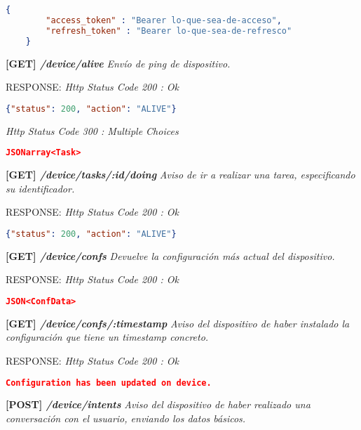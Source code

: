     \begin{lstlisting}[language=json,firstnumber=1]
    {
        "access_token" : "Bearer lo-que-sea-de-acceso",
        "refresh_token" : "Bearer lo-que-sea-de-refresco"
    }
    \end{lstlisting}    
\newpage
\textbf{[GET] \textit{/device/alive }}
\textit{Envío de ping de dispositivo.}
    
    RESPONSE:\newline
    \textit{Http Status Code 200 : Ok}
    
    \begin{lstlisting}[language=json,firstnumber=1]
    {"status": 200, "action": "ALIVE"}
    \end{lstlisting}
    \textit{Http Status Code 300 : Multiple Choices}
    
    \begin{lstlisting}[language=json,firstnumber=1]
    JSONarray<Task>
    \end{lstlisting}
\hline 
\newline
\textbf{[GET] \textit{/device/tasks/:id/doing }}
\textit{Aviso de ir a realizar una tarea, especificando su identificador.}
    
    RESPONSE: \newline
    \textit{Http Status Code 200 : Ok}
    
    \begin{lstlisting}[language=json,firstnumber=1]
    {"status": 200, "action": "ALIVE"}
    \end{lstlisting}
\hline 
\newline
\textbf{[GET] \textit{/device/confs }}
\textit{Devuelve la configuración más actual del dispositivo.}
    
    RESPONSE: \newline
    \textit{Http Status Code 200 : Ok}
    
    \begin{lstlisting}[language=json,firstnumber=1]
    JSON<ConfData>
    \end{lstlisting}
\hline 
\newline
\textbf{[GET] \textit{/device/confs/:timestamp }}
\textit{Aviso del dispositivo de haber instalado la configuración que tiene un timestamp concreto.}

    RESPONSE: \newline
    \textit{Http Status Code 200 : Ok}
    
    \begin{lstlisting}[language=json,firstnumber=1]
    Configuration has been updated on device.
    \end{lstlisting}
\hline
\textbf{[POST] \textit{/device/intents }}
\textit{Aviso del dispositivo de haber realizado una conversación con el usuario, enviando los datos básicos.}

